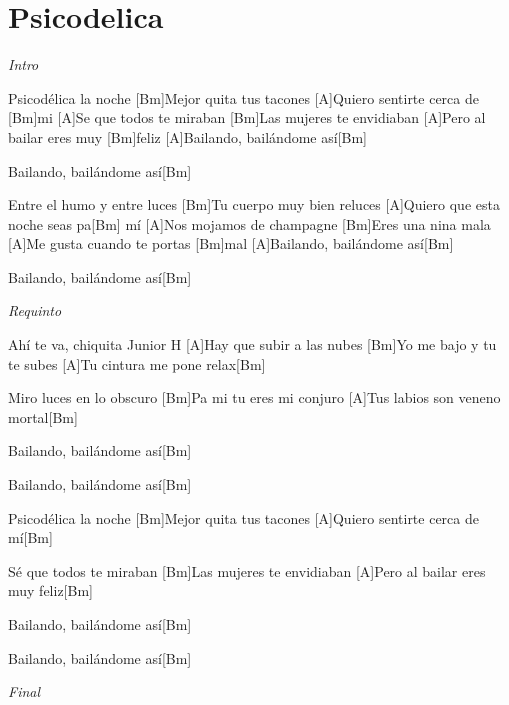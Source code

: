 \section{Psicodelica}

\noindent
\vspace{1cm}

\begin{guitar}
	\begin{multicols}{2}
		\textit{Intro} \par
		[A]Psicodélica la noche
		[Bm]Mejor quita tus tacones
		[A]Quiero sentirte cerca de [Bm]mi
		[A]Se que todos te miraban
		[Bm]Las mujeres te envidiaban
		[A]Pero al bailar eres muy [Bm]feliz
		[A]Bailando, bailándome así[Bm] \par
		[A]Bailando, bailándome así[Bm] \par
		[A]Entre el humo y entre luces
		[Bm]Tu cuerpo muy bien reluces
		[A]Quiero que esta noche seas pa[Bm] mí
		[A]Nos mojamos de champagne
		[Bm]Eres una nina mala
		[A]Me gusta cuando te portas [Bm]mal
		[A]Bailando, bailándome así[Bm] \par
		[Bm]Bailando, bailándome así[Bm] \par
		\par
		\textit{Requinto}

		Ahí te va, chiquita
		Junior H
		[A]Hay que subir a las nubes
		[Bm]Yo me bajo y tu te subes
		[A]Tu cintura me pone relax[Bm] \par
		[A]Miro luces en lo obscuro
		[Bm]Pa mi tu eres mi conjuro
		[A]Tus labios son veneno mortal[Bm] \par
		[A]Bailando, bailándome así[Bm] \par
		[A]Bailando, bailándome así[Bm] \par
		[A]Psicodélica la noche
		[Bm]Mejor quita tus tacones
		[A]Quiero sentirte cerca de mí[Bm] \par
		[A]Sé que todos te miraban
		[Bm]Las mujeres te envidiaban
		[A]Pero al bailar eres muy feliz[Bm] \par
		[A]Bailando, bailándome así[Bm] \par
		[A]Bailando, bailándome así[Bm] \par
		\par
		\textit{Final}
	\end{multicols}
\end{guitar}
